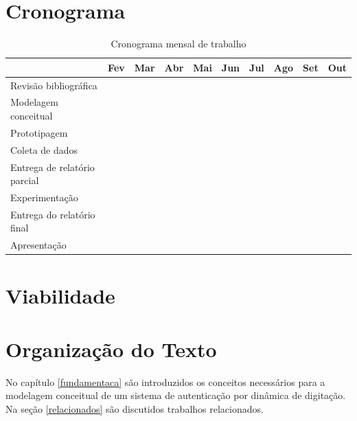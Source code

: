 \documentclass[pfc]{imetex}
\begin{document}
\section{Cronograma}
\begin{table}[htb]
\begin{tabular}{|l|c|c|c|c|c|c|c|c|c|}
\hline
& Fev & Mar & Abr & Mai & Jun & Jul & Ago & Set & Out \\
\hline
Revisão bibliográfica &
\multicolumn{2}{c}{\cellcolor[gray]{0.5}} &
\multicolumn{6}{c}{} &
\\
\hline
Modelagem conceitual &
\multicolumn{1}{c}{} &
\multicolumn{3}{c}{\cellcolor[gray]{0.5}} &
\multicolumn{4}{c}{} &
\\
\hline
Prototipagem &
\multicolumn{2}{c}{} &
\multicolumn{3}{c}{\cellcolor[gray]{0.5}} &
\multicolumn{3}{c}{} &
\\
\hline
Coleta de dados &
\multicolumn{4}{c}{} &
\multicolumn{1}{c}{\cellcolor[gray]{0.5}} &
\multicolumn{3}{c}{} &
\\
\hline
Entrega de relatório parcial &
\multicolumn{3}{c}{} &
\multicolumn{1}{c}{\cellcolor[gray]{0.5}} &
\multicolumn{1}{c}{} &
\multicolumn{1}{c}{\cellcolor[gray]{0.5}} &
\multicolumn{2}{c}{} &
\\
\hline
Experimentação &
\multicolumn{5}{c}{} &
\multicolumn{2}{c}{\cellcolor[gray]{0.5}} &
\multicolumn{1}{c}{} &
\\
\hline
Entrega do relatório final &
\multicolumn{7}{c}{} &
\multicolumn{1}{c}{\cellcolor[gray]{0.5}} &
\\
\hline
Apresentação &
\multicolumn{8}{c}{} &
\multicolumn{1}{c}{\cellcolor[gray]{0.5}}
\\
\hline
\end{tabular}

\caption{Cronograma mensal de trabalho}
\end{table}

\section{Viabilidade}


\section{Organização do Texto}
No capítulo \ref{fundamentaca} são introduzidos os conceitos necessários para a modelagem conceitual de um sistema de autenticação por dinâmica de digitação. Na seção \ref{relacionados} são discutidos trabalhos relacionados.
\end{document}
